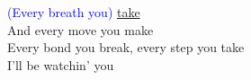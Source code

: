 
\textcolor{blue}{(Every breath you)} \underline{take} \\
And every move you make \\
Every bond you break, every step you take \\
I'll be watchin' you \\
